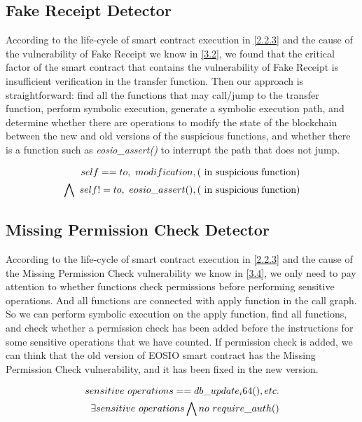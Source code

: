 \documentclass[a4paper, 10pt, conference, twocolumn]{ieeeconf}       %
\begin{document}
\subsection{Fake Receipt Detector}
According to the life-cycle of smart contract execution in \ref{2.2.3} and the cause of the vulnerability of Fake Receipt we know in \ref{3.2},
we found that the critical factor of the smart contract that contains the vulnerability of Fake Receipt is insufficient verification in the transfer function.
Then our approach is straightforward: find all the functions that may call/jump to the transfer function,
perform symbolic execution, generate a symbolic execution path,
and determine whether there are operations to modify the state of the blockchain between the new and old versions of the suspicious functions,
and whether there is a function such as \emph{eosio\_assert()} to interrupt the path that does not jump.

\begin{equation}
\begin{aligned}
self==to,~modification,(\rm~in~suspicious~function) \\
\bigwedge~self!=to,~eosio\_assert(),(\rm~in~suspicious~function) 
\end{aligned}
\end{equation}

\subsection{Missing Permission Check Detector}

According to the life-cycle of smart contract execution in \ref{2.2.3} and the cause of the Missing Permission Check vulnerability we know in \ref{3.4},
we only need to pay attention to whether functions check permissions before performing sensitive operations.
And all functions are connected with apply function in the call graph.
So we can perform symbolic execution on the apply function,
find all functions, and check whether a permission check has been added before the instructions for some sensitive operations that we have counted.
If permission check is added,
we can think that the old version of EOSIO smart contract has the Missing Permission Check vulnerability,
and it has been fixed in the new version.

\begin{equation}
\begin{aligned}
sensitive~operations == db\_update_i64(\*), etc. \\
\exists sensitive~operations \bigwedge no~require\_auth(\*)
\end{aligned}
\end{equation}
\end{document}

